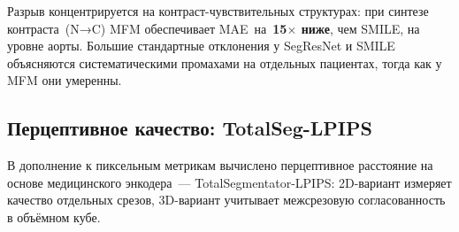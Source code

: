 \begin{table}[htbp]
\centering
\caption{MAE по анатомическим структурам (HU, held-out, среднее$\pm$ст.\,откл. по пациентам). Лучший --- \textbf{жирный}.}
\label{tab:per_organ}
\end{table}

Разрыв концентрируется на контраст-чувствительных структурах: при синтезе контраста~(N→C) MFM обеспечивает MAE~на~\textbf{15$\times$ ниже}, чем SMILE, на уровне аорты. Большие стандартные отклонения у SegResNet и SMILE объясняются систематическими промахами на отдельных пациентах, тогда как у MFM они умеренны.

\subsection{Перцептивное качество: TotalSeg-LPIPS}
\label{sec:lpips}

В дополнение к пиксельным метрикам вычислено перцептивное расстояние на основе медицинского энкодера~--- TotalSegmentator-LPIPS: 2D-вариант измеряет качество отдельных срезов, 3D-вариант учитывает межсрезовую согласованность в объёмном кубе.

